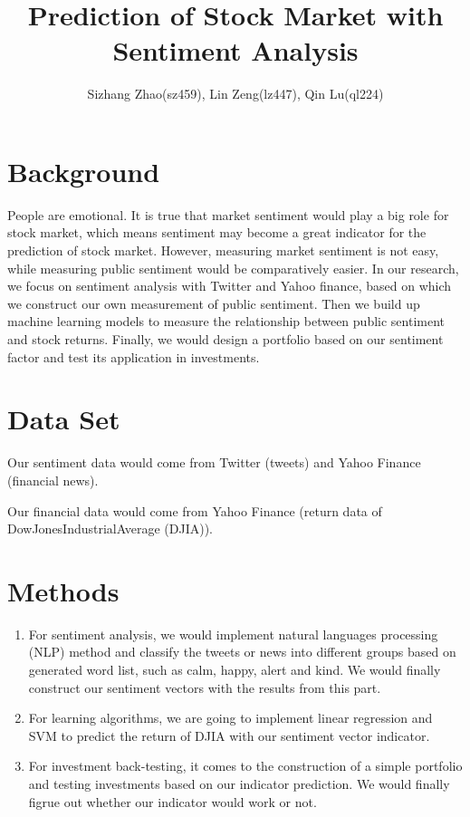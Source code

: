 \documentclass[11pt,a4paper]{article}
\numberwithin{equation}{section}
\begin{document}
\title{Prediction of Stock Market with Sentiment Analysis}
\author{Sizhang Zhao(sz459), Lin Zeng(lz447), Qin Lu(ql224)}
\maketitle

\section{Background}
People are emotional. It is true that market sentiment would play a big role for stock market, which means sentiment may become a great indicator for the prediction of stock market. However, measuring market sentiment is not easy, while measuring public sentiment would be comparatively easier. In our research, we focus on sentiment analysis with Twitter and Yahoo finance, based on which we construct our own measurement of public sentiment. Then we build up machine learning models to measure the relationship between public sentiment and stock returns. Finally, we would design a portfolio based on our sentiment factor and test its application in investments.

\section{Data Set}
Our sentiment data would come from Twitter (tweets) and Yahoo Finance (financial news).

Our financial data would come from Yahoo Finance (return data of DowJonesIndustrialAverage (DJIA)).

\section{Methods}
\begin{enumerate}
\item
For sentiment analysis, we would implement natural languages processing (NLP) method and classify the tweets or news into different groups based on generated word list, such as calm, happy, alert and kind. We would finally construct our sentiment vectors with the results from this part.
\item
For learning algorithms, we are going to implement linear regression and SVM to predict the return of DJIA with our sentiment vector indicator.
\item
For investment back-testing, it comes to the construction of a simple portfolio and testing investments based on our indicator prediction. We would finally figrue out whether our indicator would work or not.
\end{enumerate}
\end{document}
